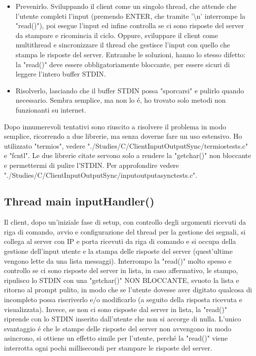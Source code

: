\begin{itemize}
	\item Prevenirlo. Sviluppando il client come un singolo thread, che attende che l'utente completi l'input (premendo ENTER, che tramite '\textbackslash n' interrompe la "read()"), poi esegue l'input ed infine controlla se ci sono risposte del server da stampare e ricomincia il ciclo. Oppure, sviluppare il client come multithread e sincronizzare il thread che gestisce l'input con quello che stampa le risposte del server. Entrambe le soluzioni, hanno lo stesso difetto: la "read()" deve essere obbligatoriamente bloccante, per essere sicuri di leggere l'intero buffer STDIN.
	\item Risolverlo, lasciando che il buffer STDIN possa "sporcarsi" e pulirlo quando necessario. Sembra semplice, ma non lo \'e, ho trovato solo metodi non funzionanti su internet. 
\end{itemize}

\leavevmode
Dopo innumerevoli tentativi sono riuscito a risolvere il problema in modo semplice, ricorrendo a due librerie, ma senza doverne fare un uso estensivo. Ho utilizzato "termios", vedere "./Studies/C/ClientInputOutputSync/termiostests.c" e "fcntl". Le due librerie citate servono solo a rendere la "getchar()" non bloccante e permettermi di pulire l'STDIN. Per approfondire vedere "./Studies/C/ClientInputOutputSync/inputoutputasynctests.c".

 \subsection{Thread main inputHandler()}
 Il client, dopo un'iniziale fase di setup, con controllo degli argomenti ricevuti da riga di comando, avvio e configurazione del thread per la gestione dei segnali, si collega al server con IP e porta ricevuti da riga di comando e si occupa della gestione dell'input utente e la stampa delle risposte del server (quest'ultime vengono lette da una lista messaggi). Interrompo la "read()" molto spesso e controllo se ci sono risposte del server in lista, in caso affermativo, le stampo, ripulisco lo STDIN con una "getchar()" NON BLOCCANTE, svuoto la lista e ritorno al prompt pulito, in modo che se l'utente dovesse aver digitato qualcosa di incompleto possa riscriverlo e/o modificarlo (a seguito della risposta ricevuta e visualizzata). Invece, se non ci sono risposte dal server in lista, la "read()" riprende con lo STDIN inserito dall'utente che non si accorge di nulla. L'unico svantaggio \'e che le stampe delle risposte del server non avvengono in modo asincrono, si ottiene un effetto simile per l'utente, perch\'e la "read()" viene interrotta ogni pochi millisecondi per stampare le risposte del server. 

